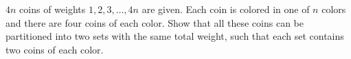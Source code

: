 $4n$ coins of weights $1, 2, 3, \ldots, 4n$ are given. Each coin is colored in one of $n$ colors and there are four coins of each color. Show that all these coins can be partitioned into two sets with the same total weight, such that each set contains two coins of each color.

